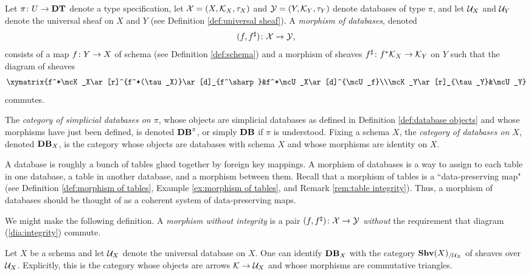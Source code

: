 \documentclass{amsart}
\begin{document}
\begin{definition}\label{def:database morphisms}

Let $\pi\colon U\rightarrow{\bf DT}$ denote a type specification, let $\mathcal{X}=(X,\mathcal{K}_X,\tau_X)$ and $\mathcal{Y}=(Y,\mathcal{K}_Y,\tau_Y)$ denote databases of type $\pi$, and let $\mathcal{U}_X$ and $\mathcal{U}_Y$ denote the universal sheaf on $X$ and $Y$ (see Definition \ref{def:universal sheaf}).  A {\em morphism of databases}, denoted $$(f,f^\sharp)\colon\mathcal{X}\rightarrow\mathcal{Y},$$ consists of a map $f\colon Y\rightarrow X$ of schema (see Definition \ref{def:schema}) and a morphism of sheaves $f^\sharp\colon f^*\mathcal{K}_X\rightarrow\mathcal{K}_Y$ on $Y$ such that the diagram of sheaves \begin{eqnarray}\label{dia:integrity}\xymatrix{f^*\mcK_X\ar[r]^{f^*(\tau_X)}\ar[d]_{f^\sharp}&f^*\mcU_X\ar[d]^{\mcU_f}\\\mcK_Y\ar[r]_{\tau_Y}&\mcU_Y}\end{eqnarray} commutes.

The {\em category of simplicial databases on $\pi$}, whose objects are simplicial databases as defined in Definition \ref{def:database objects} and whose morphisms have just been defined, is denoted ${\bf DB}^\pi$, or simply ${\bf DB}$ if $\pi$ is understood.  Fixing a schema $X$, the {\em category of databases on $X$}, denoted ${\bf DB}_X$, is the category whose objects are databases with schema $X$ and whose morphisms are identity on $X$.  

\end{definition}

\begin{remark}\label{rem:data integrity}

A database is roughly a bunch of tables glued together by foreign key mappings.  A morphism of databases is a way to assign to each table in one database, a table in another database, and a morphism between them.  Recall that a morphism of tables is a ``data-preserving map" (see Definition \ref{def:morphism of tables}, Example \ref{ex:morphism of tables}, and Remark \ref{rem:table integrity}).  Thus, a morphism of databases should be thought of as a coherent system of data-preserving maps.

We might make the following definition.  A {\em morphism without integrity} is a pair $(f,f^\sharp)\colon\mathcal{X}\rightarrow\mathcal{Y}$ {\em without} the requirement that diagram (\ref{dia:integrity}) commute.



\end{remark}

\begin{remark}\label{rem:data_X}

Let $X$ be a schema and let $\mathcal{U}_X$ denote the universal database on $X$.  One can identify ${\bf DB}_X$ with the category ${\bf Shv}(X)_{/\mathcal{U}_X}$ of sheaves over $\mathcal{U}_X$.  Explicitly, this is the category whose objects are arrows $\mathcal{K}\rightarrow\mathcal{U}_X$ and whose morphisms are commutative triangles.

\end{remark}
\end{document}
